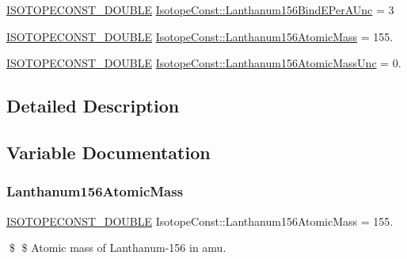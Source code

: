 \begin{DoxyCompactItemize}
\mbox{\hyperlink{group___isotope_const-_macros_ga8f45a7272ce02c0b4c65c44636ed719a}{I\+S\+O\+T\+O\+P\+E\+C\+O\+N\+S\+T\+\_\+\+D\+O\+U\+B\+LE}} \mbox{\hyperlink{group___isotope_const-_lanthanum-_la156_gabcbb835de8cbb5a5facad8577f1f43f3}{Isotope\+Const\+::\+Lanthanum156\+Bind\+E\+Per\+A\+Unc}} = 3
\item 
\mbox{\hyperlink{group___isotope_const-_macros_ga8f45a7272ce02c0b4c65c44636ed719a}{I\+S\+O\+T\+O\+P\+E\+C\+O\+N\+S\+T\+\_\+\+D\+O\+U\+B\+LE}} \mbox{\hyperlink{group___isotope_const-_lanthanum-_la156_gaf1b83d73b73b35776b450b27148d9ac7}{Isotope\+Const\+::\+Lanthanum156\+Atomic\+Mass}} = 155.
\item 
\mbox{\hyperlink{group___isotope_const-_macros_ga8f45a7272ce02c0b4c65c44636ed719a}{I\+S\+O\+T\+O\+P\+E\+C\+O\+N\+S\+T\+\_\+\+D\+O\+U\+B\+LE}} \mbox{\hyperlink{group___isotope_const-_lanthanum-_la156_ga4aa7607800d71df50519426e2e976f11}{Isotope\+Const\+::\+Lanthanum156\+Atomic\+Mass\+Unc}} = 0.
\end{DoxyCompactItemize}


\subsection{Detailed Description}


\subsection{Variable Documentation}
\mbox{\label{group___isotope_const-_lanthanum-_la156_gaf1b83d73b73b35776b450b27148d9ac7}} 
\subsubsection{\texorpdfstring{Lanthanum156\+Atomic\+Mass}{Lanthanum156AtomicMass}}
{\footnotesize\ttfamily \mbox{\hyperlink{group___isotope_const-_macros_ga8f45a7272ce02c0b4c65c44636ed719a}{I\+S\+O\+T\+O\+P\+E\+C\+O\+N\+S\+T\+\_\+\+D\+O\+U\+B\+LE}} Isotope\+Const\+::\+Lanthanum156\+Atomic\+Mass = 155.}

\$ \$ Atomic mass of Lanthanum-\/156 in amu. \mbox{\label{group___isotope_const-_lanthanum-_la156_ga4aa7607800d71df50519426e2e976f11}} 
